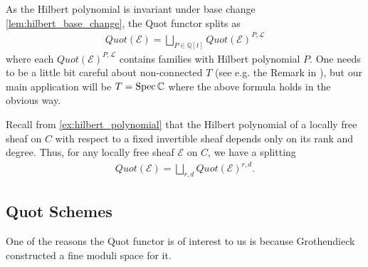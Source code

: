 \documentclass[12pt]{ociamthesis}  %
\begin{document}
As the Hilbert polynomial is invariant under base change
\ref{lem:hilbert_base_change}, the Quot functor splits as
\begin{align*}
  Quot(\mathscr E)
  = \bigsqcup_{P\in\mathbb{Q}[t]} Quot(\mathscr E)^{P,\mathscr L}
\end{align*}
where each $Quot(\mathscr E)^{P,\mathscr L}$ contains families
with Hilbert polynomial $P$. One needs to be a little bit careful
about non-connected $T$ (see e.g. the Remark in \cite[5-6]{siddharth2016}), but our main application will be
$T = \operatorname{Spec}\mathbb C$ where the above formula holds in the obvious way.

\begin{example}
  Recall from \ref{ex:hilbert_polynomial} that the Hilbert polynomial of a
  locally free sheaf on $C$ with respect to a fixed invertible sheaf depends
  only on its rank and degree.  Thus, for any locally free sheaf $\mathscr E$ on
  $C$, we have a splitting
  \begin{align}\label{eq:quot_functor_split_on_c}
    Quot(\mathscr E) = \bigsqcup_{r,d} Quot(\mathscr E)^{r,d}.
  \end{align}
  \missingexample
\end{example}

\subsection{Quot Schemes}

One of the reasons the Quot functor is of interest to us is because
Grothendieck constructed a fine moduli space for it. \missingcitation
\end{document}
